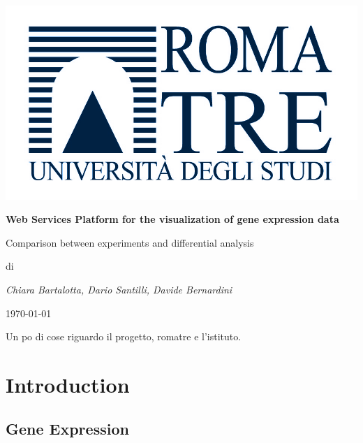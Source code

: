 \documentclass[a4paper]{report}
\begin{document}
\begin{titlepage}
\centering
{}
\includegraphics{logoRomaTre.jpg}\\
{\LARGE \bf Web Services Platform for the visualization of gene expression data\par}
\vspace{0.5cm}
{\Large Comparison between experiments and differential analysis\par} 
\vspace{2cm}
di\\
{\Large \em Chiara Bartalotta, Dario Santilli, Davide Bernardini\par}
\date{\currenttime}
\today
\end{titlepage}

\begin{Large}
Un po di cose riguardo il progetto, romatre e l'istituto.\\
\end{Large}

\tableofcontents

\part{Introduction}
\chapter{Gene Expression}
\end{document}
